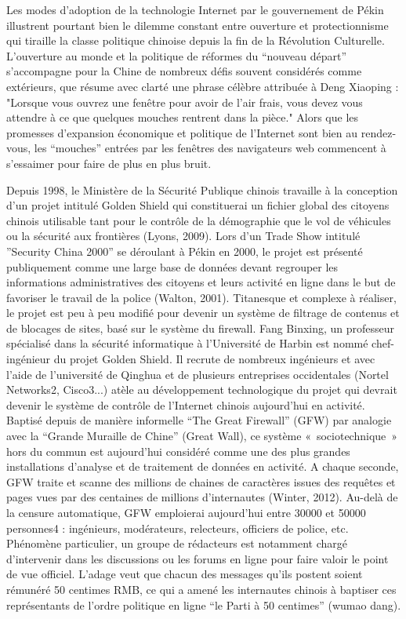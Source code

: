 Les modes d’adoption de la technologie Internet par le gouvernement de Pékin illustrent pourtant bien le dilemme constant entre ouverture et protectionnisme qui tiraille la classe politique chinoise depuis la fin de la Révolution Culturelle. L’ouverture au monde et la politique de réformes du “nouveau départ” s’accompagne pour la Chine de nombreux défis souvent considérés comme extérieurs, que résume avec clarté une phrase célèbre attribuée à Deng Xiaoping : "Lorsque vous ouvrez une fenêtre pour avoir de l’air frais, vous devez vous attendre à ce que quelques mouches rentrent dans la pièce." Alors que les promesses d’expansion économique et politique de l’Internet sont bien au rendez-vous, les “mouches” entrées par les fenêtres des navigateurs web commencent à s’essaimer pour faire de plus en plus bruit. 

Depuis 1998, le Ministère de la Sécurité Publique chinois travaille à la conception d’un projet intitulé Golden Shield qui constituerai un fichier global des citoyens chinois utilisable tant pour le contrôle de la démographie que le vol de véhicules ou la sécurité aux frontières (Lyons, 2009). Lors d’un Trade Show intitulé ”Security China 2000” se déroulant à Pékin en 2000, le projet est présenté publiquement comme une large base de données devant regrouper les informations administratives des citoyens et leurs activité en ligne dans le but de favoriser le travail de la police (Walton, 2001). Titanesque et complexe à réaliser, le projet est peu à peu modifié pour devenir un système de filtrage de contenus et de blocages de sites, basé sur le système du firewall. Fang Binxing, un professeur spécialisé dans la sécurité informatique à l’Université de Harbin est nommé chef-ingénieur du projet Golden Shield. Il recrute de nombreux ingénieurs et avec l’aide de l’université de Qinghua et de plusieurs entreprises occidentales (Nortel Networks2, Cisco3...) atèle au développement technologique du projet qui devrait devenir le système de contrôle de l’Internet chinois aujourd’hui en activité. Baptisé depuis de manière informelle “The Great Firewall” (GFW) par analogie avec la “Grande Muraille de Chine” (Great Wall), ce système « sociotechnique » hors du commun est aujourd’hui considéré comme une des plus grandes installations d’analyse et de traitement de données en activité. A chaque seconde, GFW traite et scanne des millions de chaines de caractères issues des requêtes et pages vues par des centaines de millions d’internautes (Winter, 2012). Au-delà de la censure automatique, GFW emploierai aujourd’hui entre 30000 et 50000 personnes4 : ingénieurs, modérateurs, relecteurs, officiers de police, etc. Phénomène particulier, un groupe de rédacteurs est notamment chargé d’intervenir dans les discussions ou les forums en ligne pour faire valoir le point de vue officiel. L’adage veut que chacun des messages qu’ils postent soient rémunéré 50 centimes RMB, ce qui a amené les internautes chinois à baptiser ces représentants de l’ordre politique en ligne “le Parti à 50 centimes” (wumao dang).


